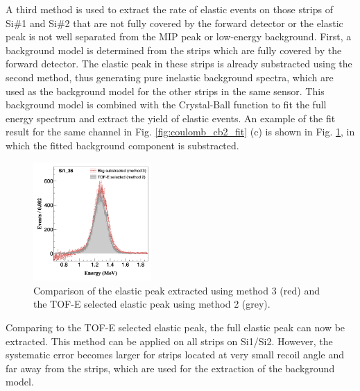 \documentclass[fleqn,twocolumn,a4paper]{ikpar}
\begin{document}
\par
\medskip

A third method is used to extract the rate of elastic events on those strips of
Si\#1 and Si\#2 that are not fully covered by the forward detector or the
elastic peak is not well separated from the MIP peak or low-energy background.
First, a background model is determined from the strips which are fully covered by the forward detector.
The elastic peak in these strips is already substracted using the second method, thus generating 
pure inelastic background spectra, which are used as the background model
for the other strips in the same sensor.
This background model is combined with the Crystal-Ball function to fit the full
energy spectrum and extract the yield of elastic events.
An example of the fit result for the same channel in Fig. \ref{fig:coulomb_cb2_fit}
(c) is shown in Fig. \ref{fig:bkg_vs_tofe}, in which the fitted background component is substracted. 
\begin{figure}[b!]
  \centering
	\includegraphics[width=0.4\textwidth]{./bkg_vs_tofe.png}
  \caption{Comparison of the elastic peak extracted using method 3 (red) and
    the TOF-E selected elastic peak using method 2 (grey).}
  \label{fig:bkg_vs_tofe}
\end{figure}
Comparing to the TOF-E selected elastic peak, the full elastic peak can now be extracted.
This method can be applied on all strips on Si1/Si2.
However, the systematic error becomes larger for strips located at very small
recoil angle and far away from the strips, which are used for the extraction of the background model.

\par
\medskip
\end{document}
